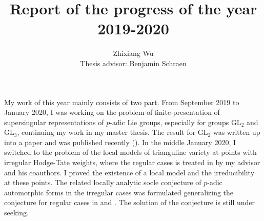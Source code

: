 \documentclass{amsart}
\title{Report of the progress of the year 2019-2020}
\author{Zhixiang Wu\\ Thesis advisor: Benjamin Schraen}
\date{}
\newcommand{\GL}{\text{GL}}
\numberwithin{equation}{section}
\begin{document}
\maketitle
My work of this year mainly consists of two part. From September 2019 to January 2020, I was working on the problem of finite-presentation of supersingular representations of $p$-adic Lie groups, especially for groups $\GL_2$ and $\GL_3$, continuing my work in my master thesis. The result for $\GL_2$ was written up into a paper and was published recently (\cite{wu2020supersingular}). In the middle January 2020, I switched to the problem of the local models of trianguline variety at points with irregular Hodge-Tate weights, where the regular cases is treated in \cite{breuil2019local} by my advisor and his coauthors. I proved the existence of a local model and the irreducibility at these points. The related locally analytic socle conjecture of $p$-adic automorphic forms in the irregular cases was formulated generalizing the conjecture for regular cases in \cite{breuil2016versI} and \cite{breuil2015versII}. The solution of the conjecture is still under seeking.
\end{document}
